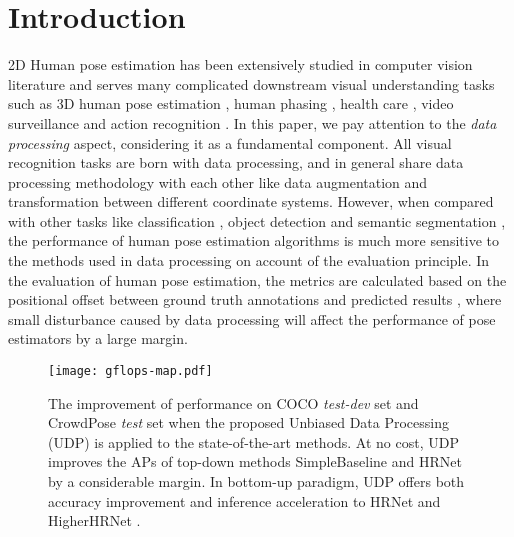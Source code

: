 \documentclass[10pt,journal,compsoc]{IEEEtran}
\begin{document}
\maketitle


\IEEEdisplaynontitleabstractindextext




\IEEEpeerreviewmaketitle


\section{Introduction}
\renewcommand{\thefootnote}{}

2D Human pose estimation has been extensively studied in computer vision literature and serves many complicated downstream visual understanding tasks such as 3D human pose estimation \cite{human36m,ci2020locally,luvizon2020multi,3d8611195,R3D,MonoCap}, human phasing \cite{liang2018look,HumanParsing}, health care \cite{VBE,chen2020fall,chen2018patient}, video surveillance \cite{li2019state,zhang2019exploiting,andriluka2018posetrack,Girdhar_2018_CVPR} and action recognition \cite{carreira2017quo, zhu2019action, zhu2019convolutional,luvizon2020multi}. In this paper, we pay attention to the \textit{data processing} aspect, considering it as a fundamental component. All visual recognition tasks are born with data processing, and in general share data processing methodology with each other like data augmentation and transformation between different coordinate systems. However, when compared with other tasks like classification \cite{ImageNet}, object detection \cite{COCO} and semantic segmentation \cite{mottaghi2014role,cordts2016cityscapes}, the performance of human pose estimation algorithms is much more sensitive to the methods used in data processing on account of the evaluation principle. In the evaluation of human pose estimation, the metrics are calculated based on the positional offset between ground truth annotations and predicted results \cite{COCO,MPII}, where small disturbance caused by data processing will affect the performance of pose estimators by a large margin.




\begin{figure}[t]
	\setlength{\abovecaptionskip}{0.cm}
    \begin{center}
        \texttt{[image: gflops-map.pdf]}
    \end{center}
   \caption{The improvement of performance on COCO \textit{test-dev} set and CrowdPose \textit{test} set when the proposed Unbiased Data Processing (UDP) is applied to the state-of-the-art methods. At no cost, UDP improves the APs of top-down methods SimpleBaseline \cite{SBNet} and HRNet \cite{HRNet} by a considerable margin. In bottom-up paradigm, UDP offers both accuracy improvement and inference acceleration to HRNet \cite{HRNet} and HigherHRNet \cite{Higher}.}
    \label{fig:mAP-gflops}
\end{figure}
\end{document}
